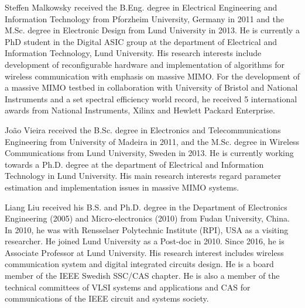 \documentclass[journal]{IEEEtran}
\begin{document}
%
%
%
%
%
%
%

%

%
%
%
%
%
%

%

%
%
%
%

%
%
%
%
%
%
%
%
%
%

%
%
%

%
%
%
%

%
%
%

%
%
%

%
%
%
%
%
%
%
%
%
%
%
%
%
%
%
%
%
%
%
%
%
\begin{IEEEbiography}{Steffen Malkowsky}
	received the B.Eng. degree in Electrical Engineering and Information Technology from Pforzheim University, Germany in 2011 and the M.Sc. degree in Electronic Design from Lund University in 2013. He is currently a PhD student in the Digital ASIC group at the department of Electrical and Information Technology, Lund University. His research interests include development of reconfigurable hardware and implementation of algorithms for wireless communication with emphasis on massive MIMO. For the development of a massive MIMO testbed in collaboration with University of Bristol and National Instruments and a set spectral efficiency world record, he received 5 international awards from National Instruments, Xilinx and Hewlett Packard Enterprise.
\end{IEEEbiography}
%
\begin{IEEEbiography}{João Vieira}
	received the B.Sc. degree in Electronics and Telecommunications Engineering from University of Madeira in 2011, and the M.Sc. degree in Wireless Communications from Lund University, Sweden in 2013. He is currently working towards a Ph.D. degree at the department of Electrical and Information Technology in Lund University. His main research interests regard parameter estimation and implementation issues in massive MIMO systems.
\end{IEEEbiography}
%
\begin{IEEEbiography}{Liang Liu}
	received his B.S. and Ph.D. degree in the Department of Electronics Engineering (2005) and Micro-electronics (2010) from Fudan University, China. In 2010, he was with Rensselaer Polytechnic Institute (RPI), USA as a visiting researcher. He joined Lund University as a Post-doc in 2010. Since 2016, he is Associate Professor at Lund University. His research interest includes wireless communication system and digital integrated circuits design. He is a board member of the IEEE Swedish SSC/CAS chapter. He is also a member of the technical committees of VLSI systems and applications and CAS for communications of the IEEE circuit and systems society.
\end{IEEEbiography}
\end{document}
